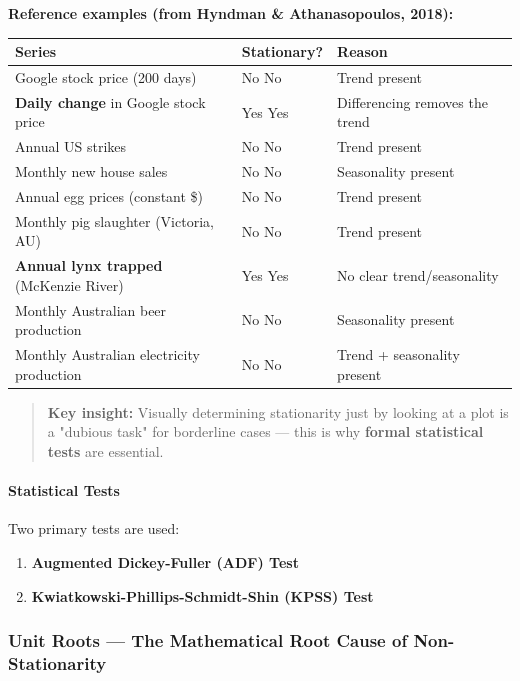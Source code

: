 \documentclass[12pt,openany]{book}
\begin{document}
\textbf{Reference examples (from Hyndman \& Athanasopoulos, 2018):}

\begin{center}
\begin{tabular}{|L{0.22\textwidth}|L{0.32\textwidth}|L{0.32\textwidth}|}
\hline
Series & Stationary? & Reason \\
\hline
Google stock price (200 days) & No No & Trend present \\
\hline
\textbf{Daily change} in Google stock price & Yes Yes & Differencing removes the trend \\
\hline
Annual US strikes & No No & Trend present \\
\hline
Monthly new house sales & No No & Seasonality present \\
\hline
Annual egg prices (constant \$) & No No & Trend present \\
\hline
Monthly pig slaughter (Victoria, AU) & No No & Trend present \\
\hline
\textbf{Annual lynx trapped} (McKenzie River) & Yes Yes & No clear trend/seasonality \\
\hline
Monthly Australian beer production & No No & Seasonality present \\
\hline
Monthly Australian electricity production & No No & Trend + seasonality present \\
\hline
\end{tabular}
\end{center}

\begin{quote}
\textbf{Key insight:} Visually determining stationarity just by looking at a plot is a "dubious task" for borderline cases --- this is why \textbf{formal statistical tests} are essential.\par

\end{quote}

\paragraph{Statistical Tests}

Two primary tests are used:
\begin{enumerate}[leftmargin=*]
    \item \textbf{Augmented Dickey-Fuller (ADF) Test}
    \item \textbf{Kwiatkowski-Phillips-Schmidt-Shin (KPSS) Test}
\end{enumerate}

\subsubsection{Unit Roots --- The Mathematical Root Cause of Non-Stationarity}
\end{document}
